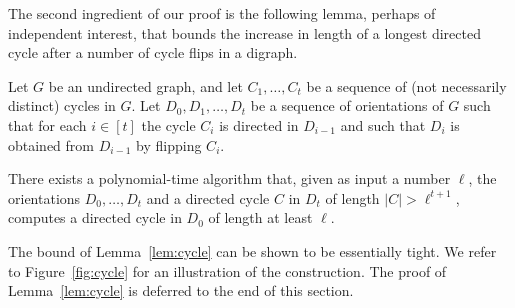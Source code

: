 \documentclass[runningheads]{llncs}
\begin{document}


The second ingredient of our proof is the following lemma, perhaps of independent interest, that bounds the increase in length of a longest directed cycle after a number of cycle flips in a digraph.

\begin{lemma}
  \label{lem:cycle}
  Let $G$ be an undirected graph, and let $C_1,\ldots,C_t$ be a sequence of (not necessarily distinct) cycles in $G$.
  Let $D_0, D_1, \ldots, D_t$ be a sequence of orientations of $G$ such that for each $i \in [t]$ the cycle $C_i$ is directed in $D_{i-1}$ and such that $D_i$ is obtained from $D_{i-1}$ by flipping $C_i$. 

There exists a polynomial-time algorithm that, given as input a number $\ell$, the orientations $D_0,\ldots,D_t$ and a directed cycle $C$ in $D_t$ of length $|C|>\ell^{t+1}$, computes a directed cycle in $D_0$ of length at least $\ell$. 
\end{lemma}

The bound of Lemma~\ref{lem:cycle} can be shown to be essentially tight. We refer to Figure~\ref{fig:cycle} for an illustration of the construction.
The proof of Lemma~\ref{lem:cycle} is deferred to the end of this section.
\end{document}
